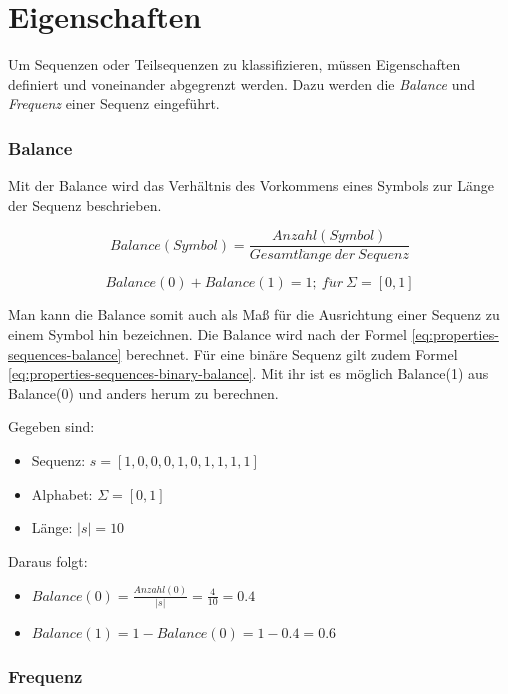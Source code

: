 \section{Eigenschaften}
\label{chp:properties-sequences}
Um Sequenzen oder Teilsequenzen zu klassifizieren, müssen Eigenschaften definiert und voneinander abgegrenzt werden. Dazu werden die \textit{Balance} und \textit{Frequenz} einer Sequenz eingeführt.

\subsubsection{Balance}

Mit der Balance wird das Verhältnis des Vorkommens eines Symbols zur Länge der Sequenz beschrieben. 

\begin{equation}
\label{eq:properties-sequences-balance}
Balance(Symbol) = \frac{Anzahl(Symbol)}{Gesamtl\ddot{a}nge\ der\ Sequenz}
\end{equation}

\begin{equation}
\label{eq:properties-sequences-binary-balance}
Balance(0) + Balance(1) = 1;\ f\ddot{u}r\ \Sigma = [0,1]
\end{equation}

Man kann die Balance somit auch als Maß für die Ausrichtung einer Sequenz zu einem Symbol hin bezeichnen. Die Balance wird nach der Formel \ref{eq:properties-sequences-balance} berechnet. Für eine binäre Sequenz gilt zudem Formel \ref{eq:properties-sequences-binary-balance}. Mit ihr ist es möglich Balance(1) aus Balance(0) und anders herum zu berechnen.

\begin{theorem}
Gegeben sind:
\begin{itemize}[noitemsep]
	\item Sequenz: $s = [1,0,0,0,1,0,1,1,1,1]$
	\item Alphabet: $\Sigma = [0,1]$
	\item Länge: $|s| = 10$
\end{itemize}
Daraus folgt:
\begin{itemize}
	\item [] $Balance(0) = \frac{Anzahl(0)}{|s|} = \frac{4}{10} = 0.4$
	\item [] $Balance(1) = 1 - Balance(0) = 1 - 0.4 = 0.6$
\end{itemize}
\end{theorem}

\subsubsection{Frequenz}

